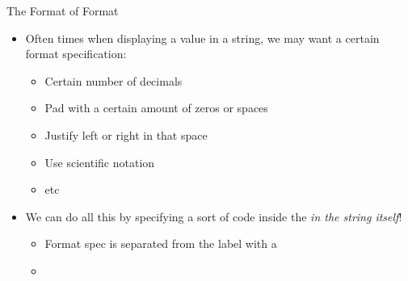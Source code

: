 \documentclass[pdf, aspectratio=169, 12pt]{beamer}
\begin{document}
\begin{frame}{The Format of Format}
	\begin{itemize}
		\item Often times when displaying a value in a string, we may want a certain format specification:
			\begin{itemize}
				\item Certain number of decimals
				\item Pad with a certain amount of zeros or spaces
				\item Justify left or right in that space
				\item Use scientific notation
				\item etc
			\end{itemize}
		\item We can do all this by specifying a sort of code inside the \pyi{\{ \}} \emph{in the string itself}!
			\begin{itemize}
				\item Format spec is separated from the label with a \pyi{:}
				\item {}
			\end{itemize}
	\end{itemize}
\end{frame}
\end{document}
